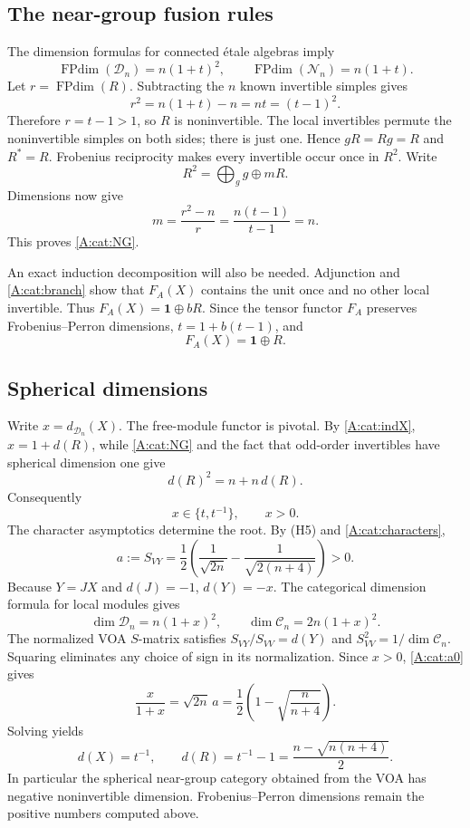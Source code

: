 \documentclass[11pt]{article}
\newcommand{\one}{\mathbf1}\newcommand{\D}{\mathcal D}\newcommand{\Dcat}{\mathcal D}
\newcommand{\Ncat}{\mathcal N}\newcommand{\Pcat}{\mathcal P}\newcommand{\Fcat}{\mathcal F}
\newcommand{\FP}{\operatorname{FPdim}}\newcommand{\Irr}{\operatorname{Irr}}
\numberwithin{equation}{section}
\begin{document}
\subsection{The near-group fusion rules}\label{A:cat:neargroup}
The dimension formulas for connected \'etale algebras \cite[Lemma 3.11 and Corollary 3.32]{A:DMNO} imply
\begin{equation}\label{A:cat:globalFP}
 \FP(\D_n)=n(1+t)^2,\qquad \FP(\Ncat_n)=n(1+t).
\end{equation}
Let $r=\FP(R)$. Subtracting the $n$ known invertible simples gives
\[
 r^2=n(1+t)-n=nt=(t-1)^2.
\]
Therefore $r=t-1>1$, so $R$ is noninvertible. The local invertibles permute the noninvertible simples on both sides; there is just one. Hence $gR=Rg=R$ and $R^*=R$. Frobenius reciprocity makes every invertible occur once in $R^2$. Write
\[
 R^2=\bigoplus_g g\oplus mR.
\]
Dimensions now give
\[
 m=\frac{r^2-n}{r}=\frac{n(t-1)}{t-1}=n.
\]
This proves \eqref{A:cat:NG}.

An exact induction decomposition will also be needed. Adjunction and \eqref{A:cat:branch} show that $F_A(X)$ contains the unit once and no other local invertible. Thus $F_A(X)=\one\oplus bR$. Since the tensor functor $F_A$ preserves Frobenius--Perron dimensions, $t=1+b(t-1)$, and
\begin{equation}\label{A:cat:indX}
 F_A(X)=\one\oplus R.
\end{equation}

\subsection{Spherical dimensions}\label{A:cat:spherical}
Write $x=d_{\D_n}(X)$. The free-module functor is pivotal. By \eqref{A:cat:indX}, $x=1+d(R)$, while \eqref{A:cat:NG} and the fact that odd-order invertibles have spherical dimension one give
\[
 d(R)^2=n+n\,d(R).
\]
Consequently
\[
 x\in\{t,t^{-1}\},\qquad x>0.
\]
The character asymptotics determine the root. By (H5) and \eqref{A:cat:characters},
\begin{equation}\label{A:cat:a0}
 a:=S_{VY}=\frac12\left(\frac1{\sqrt{2n}}-\frac1{\sqrt{2(n+4)}}\right)>0.
\end{equation}
Because $Y=JX$ and $d(J)=-1$, $d(Y)=-x$. The categorical dimension formula for local modules gives
\[
 \dim\D_n=n(1+x)^2,\qquad \dim\mathcal C_n=2n(1+x)^2.
\]
The normalized VOA $S$-matrix satisfies $S_{VY}/S_{VV}=d(Y)$ and $S_{VV}^2=1/\dim\mathcal C_n$. Squaring eliminates any choice of sign in its normalization. Since $x>0$, \eqref{A:cat:a0} gives
\[
 \frac{x}{1+x}=\sqrt{2n}\,a
 =\frac12\left(1-\sqrt{\frac n{n+4}}\right).
\]
Solving yields
\begin{equation}\label{A:cat:negdim}
 d(X)=t^{-1},\qquad
 d(R)=t^{-1}-1=\frac{n-\sqrt{n(n+4)}}2.
\end{equation}
In particular the spherical near-group category obtained from the VOA has negative noninvertible dimension. Frobenius--Perron dimensions remain the positive numbers computed above.
\end{document}
